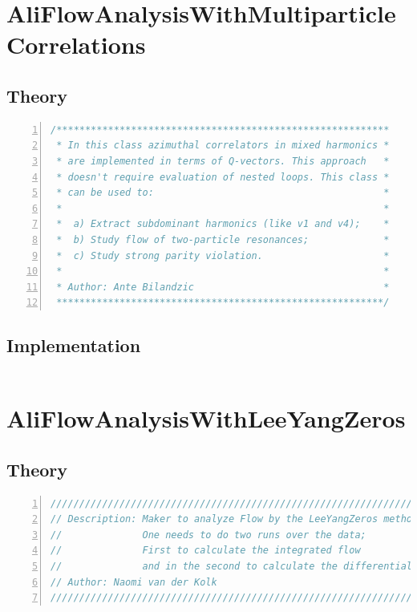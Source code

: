 \documentclass[a4paper]{book}
\numberwithin{equation}{subsection}
\begin{document}
\section{AliFlowAnalysisWithMultiparticleCorrelations}
\subsection{Theory}
\begin{lstlisting}[language=C, numbers=left]
/********************************************************** 
 * In this class azimuthal correlators in mixed harmonics *
 * are implemented in terms of Q-vectors. This approach   *
 * doesn't require evaluation of nested loops. This class *
 * can be used to:                                        *
 *                                                        *  
 *  a) Extract subdominant harmonics (like v1 and v4);    *
 *  b) Study flow of two-particle resonances;             *
 *  c) Study strong parity violation.                     * 
 *                                                        * 
 * Author: Ante Bilandzic                                 *
 *********************************************************/ \end{lstlisting}
\subsection{Implementation}
\begin{lstlisting}[language=C, numbers=left]

\end{lstlisting}


\section{AliFlowAnalysisWithLeeYangZeros}
\subsection{Theory}
\begin{lstlisting}[language=C, numbers=left]
////////////////////////////////////////////////////////////////////
// Description: Maker to analyze Flow by the LeeYangZeros method
//              One needs to do two runs over the data; 
//              First to calculate the integrated flow 
//              and in the second to calculate the differential flow
// Author: Naomi van der Kolk 
//////////////////////////////////////////////////////////////////// \end{lstlisting}
\end{document}
